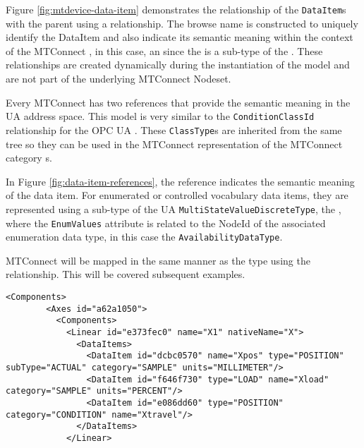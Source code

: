

Figure \ref{fig:mtdevice-data-item} demonstrates the relationship of the \texttt{Data\-Item}s with the parent  using a  relationship. The browse name is constructed to uniquely identify the DataItem and also indicate its semantic meaning within the context of the MTConnect , in this case, an  since the  is a sub-type of the . These relationships are created dynamically during the instantiation of the model and are not part of the underlying MTConnect Nodeset.

Every MTConnect  has two references that provide the semantic meaning in the UA address space. This model is very similar to the \texttt{Condition\-Class\-Id} relationship for the OPC UA . These \texttt{Class\-Type}s are inherited from the same tree so they can be used in the MTConnect representation of the MTConnect  category s.



In Figure \ref{fig:data-item-references}, the  reference indicates the semantic meaning of the data item. For enumerated or controlled vocabulary data items, they are represented using a sub-type of the UA \texttt{Multi\-State\-Value\-Discrete\-Type}, the , where the \texttt{Enum\-Values} attribute is related to the NodeId of the associated enumeration data type, in this case the \texttt{Availability\-Data\-Type}.

MTConnect  will be mapped in the same manner as the type using the  relationship. This will be covered subsequent examples.

\begin{lstlisting}[firstnumber=last,%
    caption={Components and Conditions},label={lst:device-axis-component}]
      <Components>
        <Axes id="a62a1050">
          <Components>
            <Linear id="e373fec0" name="X1" nativeName="X">
              <DataItems>
                <DataItem id="dcbc0570" name="Xpos" type="POSITION" subType="ACTUAL" category="SAMPLE" units="MILLIMETER"/>
                <DataItem id="f646f730" type="LOAD" name="Xload" category="SAMPLE" units="PERCENT"/>
                <DataItem id="e086dd60" type="POSITION" category="CONDITION" name="Xtravel"/>
              </DataItems>
            </Linear>
\end{lstlisting}

